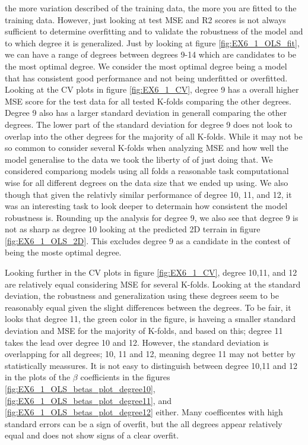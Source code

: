 \documentclass[11pt, a4paper]{article}
\begin{document}
the more variation described of the training data, the more you are fitted to the training data. However, just looking at test MSE and R2 scores is not always sufficient
to determine overfitting and to validate the robustness of the model and to which degree it is generalized. Just by looking at figure \ref{fig:EX6_1_OLS_fit}, we can have a range of degrees 
between degrees 9-14 which are candidates to be the most optimal degree. We consider the most optimal degree being a model that has consistent good performance and not being underfitted or overfitted. 
Looking at the CV plots in figure \ref{fig:EX6_1_CV}, degree 9 has a overall higher MSE score for the test data for all tested K-folds comparing the other degrees. Degree 9 also has a larger standard deviation 
in generall comparing the other degrees. The lower part of the standard deviation for degree 9 does not look to overlap into the other degrees for the majority of all K-folds. While it may not be so common 
to consider several K-folds when analyzing MSE and how well the model generalise to the data we took the liberty of of just doing that. We considered compariong models using all folds a reasonable task 
computational wise for all different degrees on the data size that we ended up using. We also though that given the relativly similar performance of degree 10, 11, and 12, it was an interesting task to 
look deeper to determain how consistent the model robustness is. Rounding up the analysis for degree 9, we also see that degree 9 is not as sharp as degree 10 looking at the predicted 2D terrain in figure \ref{fig:EX6_1_OLS_2D}. 
This excludes degree 9 as a candidate in the contest of being the moste optimal degree. 

Looking further in the CV plots in figure \ref{fig:EX6_1_CV}, degree 10,11, and 12 are relatively equal considering MSE for several K-folds. Looking at the standard deviation,
the robustness and generalization using these degrees seem to be reasonably equal given the slight differences between the degrees. To be fair, it looks that degree 11, the green color in the figure,
is haveing a smaller standard deviation and MSE for the majority of K-folds, and based on this; degree 11 takes the lead over degree 10 and 12. However, the standard deviation is overlapping for all 
degrees; 10, 11 and 12, meaning degree 11 may not better by statistically meassures. It is not easy to distinguish between degree 10,11 and 12 in the 
plots of the $\beta$ coefficients in the figures \ref{fig:EX6_1_OLS_betas_plot_degree10}, \ref{fig:EX6_1_OLS_betas_plot_degree11}, and \ref{fig:EX6_1_OLS_betas_plot_degree12} either. 
Many coefficentes with high standard errors can be a sign of overfit, but the all degrees appear relatively equal and does not show signs of a clear overfit. 
\end{document}
